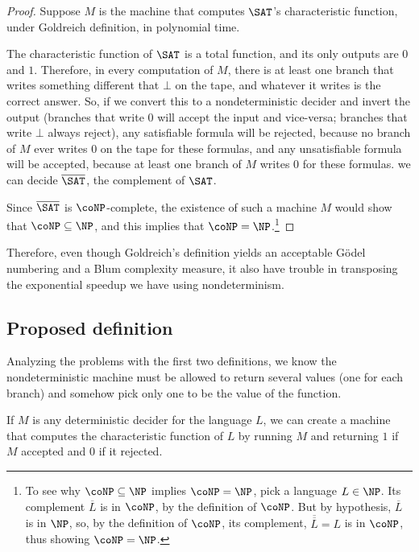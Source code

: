 \documentclass[12pt]{article}
\theoremstyle{definition}
\begin{document}
\begin{proof}
    Suppose $M$ is the machine that computes $\SAT$'s characteristic function,
    under Goldreich definition, in polynomial time.

    The characteristic function of $\SAT$ is a total function,
    and its only outputs are $0$ and $1$.
    Therefore, in every computation of $M$,
    there is at least one branch that writes something different that $\bot$ on the tape,
    and whatever it writes is the correct answer.
    So, if we convert this to a nondeterministic decider and invert the output
    (branches that write $0$ will accept the input and vice-versa;
    branches that write $\bot$ always reject),
    any satisfiable formula will be rejected,
    because no branch of $M$ ever writes $0$ on the tape for these formulas,
    and any unsatisfiable formula will be accepted,
    because at least one branch of $M$ writes $0$ for these formulas.
    we can decide $\overline \SAT$, the complement of $\SAT$.

    Since $\overline \SAT$ is $\coNP$-complete,
    the existence of such a machine $M$
    would show that $\coNP \subseteq \NP$,
    and this implies that $\coNP = \NP$.\footnote{
        To see why $\coNP \subseteq \NP$ implies $\coNP = \NP$,
        pick a language $L \in \NP$.
        Its complement $\overline L$ is in $\coNP$, by the definition of $\coNP$.
        But by hypothesis, $\overline L$ is in $\NP$,
        so, by the definition of $\coNP$,
        its complement, $\overline{\overline L} = L$ is in $\coNP$,
        thus showing $\coNP = \NP$.
    }
\end{proof}

Therefore, even though Goldreich's definition
yields an acceptable Gödel numbering and a Blum complexity measure,
it also have trouble in transposing the exponential speedup
we have using nondeterminism.

\subsection{Proposed definition}
\label{sec:proposed}

Analyzing the problems with the first two definitions,
we know the nondeterministic machine must be allowed to return several values
(one for each branch)
and somehow pick only one to be the value of the function.

If $M$ is any deterministic decider for the language $L$,
we can create a machine that computes the characteristic function of $L$
by running $M$ and returning $1$ if $M$ accepted and $0$ if it rejected.
\end{document}
